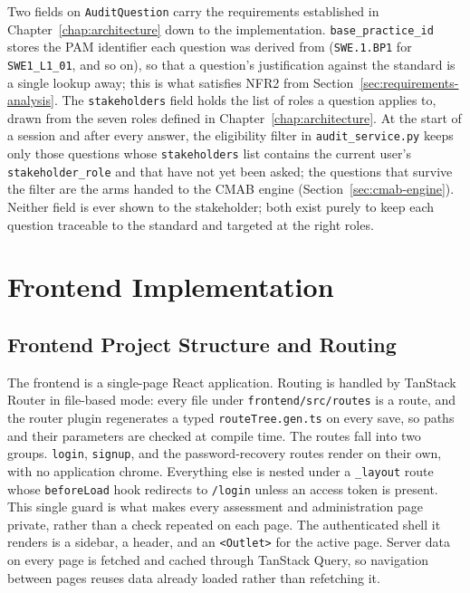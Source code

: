 \documentclass[a4paper, 12pt, oneside, openany, BCOR1cm,toc=chapterentrywithdots]{scrbook}
\begin{document}
Two fields on \texttt{AuditQuestion} carry the requirements established in
Chapter~\ref{chap:architecture} down to the implementation. \texttt{base\_practice\_id} stores
the PAM identifier each question was derived from (\texttt{SWE.1.BP1} for
\texttt{SWE1\_L1\_01}, and so on), so that a question's justification against the standard is a
single lookup away; this is what satisfies NFR2 from Section~\ref{sec:requirements-analysis}.
The \texttt{stakeholders} field holds the list of roles a question applies to, drawn from the
seven roles defined in Chapter~\ref{chap:architecture}. At the start of a session and after
every answer, the eligibility filter in \texttt{audit\_service.py} keeps only those questions
whose \texttt{stakeholders} list contains the current user's \texttt{stakeholder\_role} and
that have not yet been asked; the questions that survive the filter are the arms handed to the
CMAB engine (Section~\ref{sec:cmab-engine}). Neither field is ever shown to the stakeholder;
both exist purely to keep each question traceable to the standard and targeted at the right
roles.

\section{Frontend Implementation}
\label{sec:frontend-impl}

\subsection{Frontend Project Structure and Routing}

The frontend is a single-page React application. Routing is handled by TanStack Router in
file-based mode: every file under \texttt{frontend/src/routes} is a route, and the router plugin
regenerates a typed \texttt{routeTree.gen.ts} on every save, so paths and their parameters are
checked at compile time. The routes fall into two groups. \texttt{login}, \texttt{signup}, and
the password-recovery routes render on their own, with no application chrome. Everything else is
nested under a \texttt{\_layout} route whose \texttt{beforeLoad} hook redirects to
\texttt{/login} unless an access token is present. This single guard is what makes every
assessment and administration page private, rather than a check repeated on each page. The
authenticated shell it renders is a sidebar, a header, and an \texttt{<Outlet>} for the active
page. Server data on every page is fetched and cached through TanStack Query, so navigation
between pages reuses data already loaded rather than refetching it.
\end{document}
